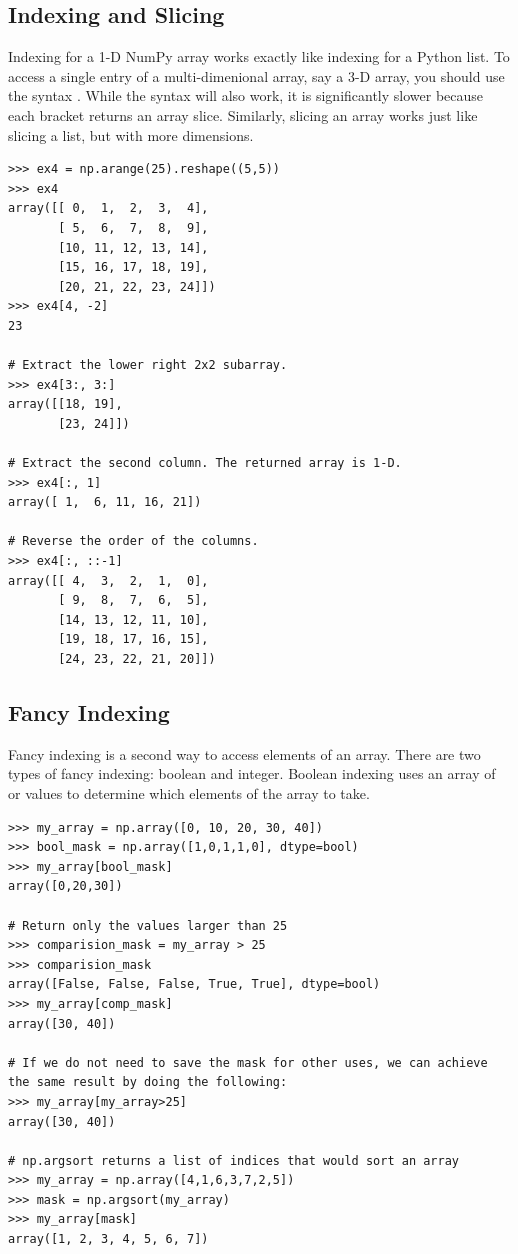\subsection*{Indexing and Slicing} 
Indexing for a 1-D NumPy array works exactly like indexing for a Python list. 
To access a single entry of a multi-dimenional array, say a 3-D array, you should use the syntax . 
While the syntax  will also work, it is significantly slower because each bracket returns an array slice. 
Similarly, slicing an array works just like slicing a list, but with more dimensions.
\begin{lstlisting}
>>> ex4 = np.arange(25).reshape((5,5)) 
>>> ex4
array([[ 0,  1,  2,  3,  4],
       [ 5,  6,  7,  8,  9],
       [10, 11, 12, 13, 14],
       [15, 16, 17, 18, 19],
       [20, 21, 22, 23, 24]])
>>> ex4[4, -2]
23

# Extract the lower right 2x2 subarray.
>>> ex4[3:, 3:] 
array([[18, 19],
       [23, 24]])
       
# Extract the second column. The returned array is 1-D.
>>> ex4[:, 1] 
array([ 1,  6, 11, 16, 21]) 

# Reverse the order of the columns.
>>> ex4[:, ::-1] 
array([[ 4,  3,  2,  1,  0],
       [ 9,  8,  7,  6,  5],
       [14, 13, 12, 11, 10],
       [19, 18, 17, 16, 15],
       [24, 23, 22, 21, 20]])
\end{lstlisting}

\subsection*{Fancy Indexing}
Fancy indexing is a second way to access elements of an array. 
There are two types of fancy indexing: boolean and integer. 
Boolean indexing uses an array of  or  values to 
determine which elements of the array to take. 

\begin{lstlisting}
>>> my_array = np.array([0, 10, 20, 30, 40])
>>> bool_mask = np.array([1,0,1,1,0], dtype=bool)
>>> my_array[bool_mask]
array([0,20,30])

# Return only the values larger than 25
>>> comparision_mask = my_array > 25
>>> comparision_mask
array([False, False, False, True, True], dtype=bool)
>>> my_array[comp_mask]
array([30, 40])

# If we do not need to save the mask for other uses, we can achieve the same result by doing the following:
>>> my_array[my_array>25]
array([30, 40])

# np.argsort returns a list of indices that would sort an array
>>> my_array = np.array([4,1,6,3,7,2,5])
>>> mask = np.argsort(my_array)
>>> my_array[mask]
array([1, 2, 3, 4, 5, 6, 7])
\end{lstlisting}

